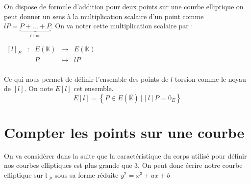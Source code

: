 \documentclass{article}
\begin{document}
On dispose de formule d'addition pour deux points sur une courbe elliptique on peut donner un sens à la multiplication scalaire d'un point comme $lP = \underbrace{P + \ldots + P}_{l \text{ fois}}$. On va noter cette multiplication scalaire par :
\newline

$\begin{array}{ccccc}
[l]_E & : & E(\mathbb{K}) & \to & E(\mathbb{K}) \\
 & & P & \mapsto & lP\\
\end{array}$

Ce qui nous permet de définir l'ensemble des points de $l$-torsion comme le noyau de $[l]$. On note $E[l]$ cet ensemble.
\newline
$$E[l] = \left\{ P \in E(\overline{\mathbb{K}}) \, | \, [l]P = 0_E \right\} $$

\section{Compter les points sur une courbe}
On va considérer dans la suite que la caractéristique du corps utilisé pour définir nos courbes elliptiques est plus grande que $3$. On peut donc écrire notre courbe elliptique sur $\mathbb{F}_p$ sous sa forme réduite $y^2 = x^3 + ax+b$
\end{document}
